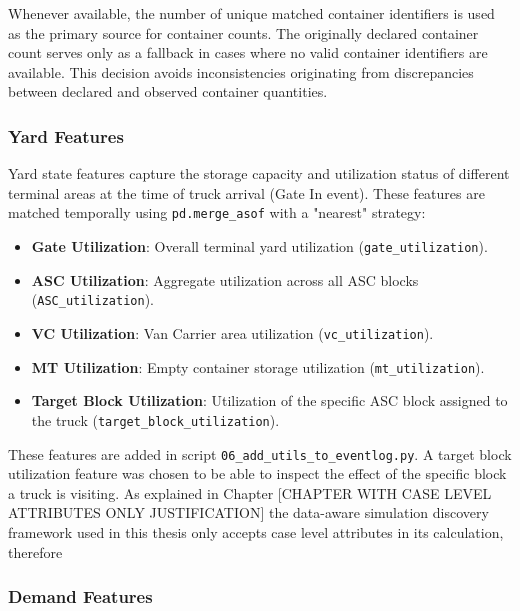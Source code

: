         \begin{sloppypar}
        Whenever available, the number of unique matched container identifiers is used as the primary source for container counts. The originally declared container count serves only as a fallback in cases where no valid container identifiers are available. This decision avoids inconsistencies originating from discrepancies between declared and observed container quantities.
        \end{sloppypar}

        \subsubsection{Yard Features}

        Yard state features capture the storage capacity and utilization status of different terminal areas at the time of truck arrival (Gate In event). These features are matched temporally using \texttt{pd.merge\_asof} with a "nearest" strategy:
        
        \begin{itemize}
            \item \textbf{Gate Utilization}: Overall terminal yard utilization (\texttt{gate\_utilization}).
            \item \textbf{ASC Utilization}: Aggregate utilization across all ASC blocks (\texttt{ASC\_utilization}).
            \item \textbf{VC Utilization}: Van Carrier area utilization (\texttt{vc\_utilization}).
            \item \textbf{MT Utilization}: Empty container storage utilization (\texttt{mt\_utilization}).
            \item \textbf{Target Block Utilization}: Utilization of the specific ASC block assigned to the truck (\texttt{target\_block\_utilization}).
        \end{itemize}
        
        These features are added in script \texttt{06\_add\_utils\_to\_eventlog.py}. A target block utilization feature was chosen to be able to inspect the effect of the specific block a truck is visiting. As explained in Chapter [CHAPTER WITH CASE LEVEL ATTRIBUTES ONLY JUSTIFICATION] the data-aware simulation discovery framework used in this thesis only accepts case level attributes in its calculation, therefore 

        \subsubsection{Demand Features}
        
